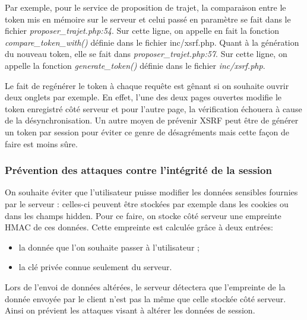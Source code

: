 \documentclass[a4paper]{article}
\begin{document}
Par exemple, pour le service de proposition de trajet, la comparaison entre
le token mis en mémoire sur le serveur et celui passé en paramètre se fait
dans le fichier \textit{proposer\_trajet.php:54}. Sur cette ligne, on appelle en
fait la fonction \textit{compare\_token\_with()} définie dans le fichier
inc/xsrf.php. Quant à la génération du nouveau token, elle se fait dans
\textit{proposer\_trajet.php:57}.  Sur cette ligne, on appelle la fonction
\textit{generate\_token()} définie dans le fichier \textit{inc/xsrf.php}.
 		
Le fait de regénérer le token à chaque requête est gênant si on
souhaite ouvrir deux onglets par exemple. En effet, l'une des deux
pages ouvertes modifie le token enregistré côté serveur et pour l'autre
page, la vérification échouera à cause de la désynchronisation.
Un autre moyen de prévenir XSRF peut être de générer un token par
session pour éviter ce genre de désagréments mais cette façon de faire
est moins sûre.
 		
\subsubsection{Prévention des attaques contre l'intégrité de la session}
On souhaite éviter que l'utilisateur puisse modifier les données sensibles fournies par le serveur : 
celles-ci peuvent être stockées par exemple dans les cookies ou dans les champs hidden. 
Pour ce faire, on stocke côté serveur une empreinte
HMAC de ces données. Cette empreinte est
calculée grâce à deux entrées:

\begin{itemize}
	\item la donnée que l'on souhaite passer à l'utilisateur ;
	\item la clé privée connue seulement du serveur.
\end{itemize}

Lors de l'envoi de données altérées,
le serveur détectera que l'empreinte de la donnée envoyée par le client
n'est pas la même que celle stockée côté serveur. Ainsi on prévient les
attaques visant à altérer les données de session.
\end{document}
